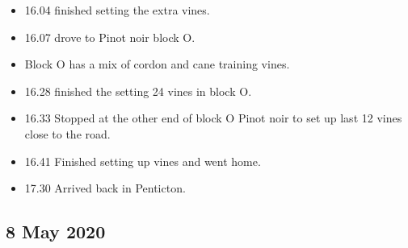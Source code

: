 \documentclass[11pt,letter]{article}
\newenvironment{smitemize}{
\begin{itemize}
  \setlength{\itemsep}{0pt}
  \setlength{\parskip}{0.8pt}
  \setlength{\parsep}{0pt}}
{\end{itemize}
}
\begin{document}
\begin{smitemize}
\item 16.04 finished setting the extra vines.
\item 16.07 drove to Pinot noir block O.
\item Block O has a mix of cordon and cane training vines. 
\item 16.28 finished the setting 24 vines in block O.
\item 16.33 Stopped at the other end of block O Pinot noir to set up last 12 vines close to the road.
\item 16.41 Finished setting up vines and went home.
\item 17.30 Arrived back in Penticton.

\end{smitemize}


\subsection{8 May 2020}
\end{document}

